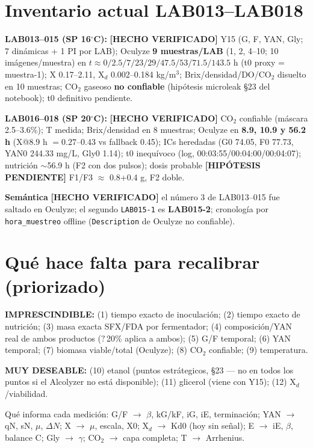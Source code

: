 \documentclass[11pt,a4paper]{article}
\newcommand{\hecho}{\textcolor{hecho}{\textbf{[HECHO VERIFICADO]}}}
\newcommand{\hipo}{\textcolor{hipo}{\textbf{[HIP\'OTESIS PENDIENTE]}}}
\newcommand{\ruta}[1]{\texttt{\small #1}}
\begin{document}
\section{Inventario actual LAB013--LAB018}

\textbf{LAB013--015 (SP 16$^\circ$C):} \hecho{} Y15 (G, F, YAN, Gly; 7 din\'amicas + 1 PI por LAB); Oculyze \textbf{9 muestras/LAB} (1, 2, 4--10; 10 im\'agenes/muestra) en $t \approx 0/2.5/7/23/29/47.5/53/71.5/143.5$ h (t0 proxy = muestra-1); X 0.17--2.11, X$_d$ 0.002--0.184 kg/m$^3$; Brix/densidad/DO/CO$_2$ disuelto en 10 muestras; CO$_2$ gaseoso \textbf{no confiable} (hip\'otesis microleak \S23 del notebook); t0 definitivo pendiente.

\textbf{LAB016--018 (SP 20$^\circ$C):} \hecho{} CO$_2$ confiable (m\'ascara 2.5--3.6\%); T medida; Brix/densidad en 8 muestras; Oculyze en \textbf{8.9, 10.9 y 56.2 h} (X@8.9 h $= 0.27$--$0.43$ vs fallback 0.45); ICs heredadas (G0 74.05, F0 77.73, YAN0 244.33 mg/L, Gly0 1.14); t0 inequ\'ivoco (log, 00:03:55/00:04:00/00:04:07); nutrici\'on ${\sim}$56.9 h (F2 con dos pulsos); dosis probable \hipo{} F1/F3 $\approx$ 0.8+0.4 g, F2 doble.

\textbf{Sem\'antica} \hecho{} el n\'umero 3 de LAB013--015 fue saltado en Oculyze; el segundo \ruta{LAB015-1} es \textbf{LAB015-2}; cronolog\'ia por \ruta{hora\_muestreo} offline (\ruta{Description} de Oculyze no confiable).

\section{Qu\'e hace falta para recalibrar (priorizado)}

\textbf{IMPRESCINDIBLE:} (1) tiempo exacto de inoculaci\'on; (2) tiempo exacto de nutrici\'on; (3) masa exacta SFX/FDA por fermentador; (4) composici\'on/YAN real de ambos productos ($?$\,20\% aplica a ambos); (5) G/F temporal; (6) YAN temporal; (7) biomasa viable/total (Oculyze); (8) CO$_2$ confiable; (9) temperatura.

\textbf{MUY DESEABLE:} (10) etanol (puntos estr\'ategicos, \S23 --- no en todos los puntos si el Alcolyzer no est\'a disponible); (11) glicerol (viene con Y15); (12) X$_d$/viabilidad.

Qu\'e informa cada medici\'on: G/F $\to$ $\beta$, kG/kF, iG, iE, terminaci\'on; YAN $\to$ qN, sN, $\mu$, $\Delta N$; X $\to$ $\mu$, escala, X0; X$_d$ $\to$ Kd0 (hoy sin se\~nal); E $\to$ iE, $\beta$, balance C; Gly $\to$ $\gamma$; CO$_2$ $\to$ capa completa; T $\to$ Arrhenius.
\end{document}
